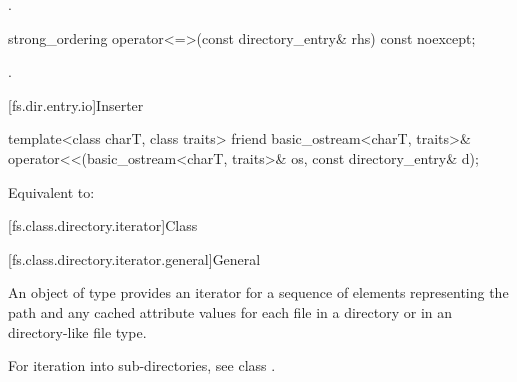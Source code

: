 \begin{itemdescr}
\pnum
\returns
{}.
\end{itemdescr}

%
\begin{itemdecl}
strong_ordering operator<=>(const directory_entry& rhs) const noexcept;
\end{itemdecl}

\begin{itemdescr}
\pnum
\returns
{}.
\end{itemdescr}

[fs.dir.entry.io]{Inserter}

%
\begin{itemdecl}
template<class charT, class traits>
  friend basic_ostream<charT, traits>&
    operator<<(basic_ostream<charT, traits>& os, const directory_entry& d);
\end{itemdecl}

\begin{itemdescr}
\pnum
\effects
Equivalent to: 
\end{itemdescr}

[fs.class.directory.iterator]{Class }

[fs.class.directory.iterator.general]{General}

%
\pnum
An object of type  provides an iterator for a
sequence of  elements representing the
path and any cached attribute values
for each file in a directory
or in an  directory-like file type.
\begin{note}
For iteration into sub-directories, see class .
\end{note}

